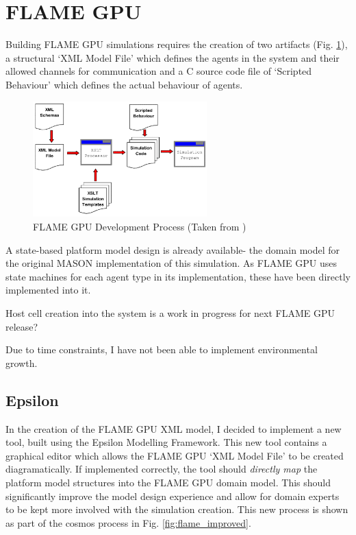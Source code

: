 \documentclass{UoYCSproject}
\begin{document}
\section{\gls{FLAME GPU}}
Building \gls{FLAME GPU} simulations requires the creation of two artifacts (Fig. \ref{fig:flame_dev}), a structural `XML Model File' which defines the agents in the system and their allowed channels for communication and a C source code file of `Scripted Behaviour' which defines the actual behaviour of agents.

\begin{figure}[htp]
\centering
\includegraphics[width=0.6\textwidth]{Appendix/FLAME_Process}
\caption{\gls{FLAME GPU} Development Process (Taken from \cite{flame_simulation})}
\label{fig:flame_dev}
\end{figure}

A state-based platform model design is already available- the domain model for the original \gls{MASON} implementation of this simulation.
As \gls{FLAME GPU} uses state machines for each agent type in its implementation, these have been directly implemented into it.

Host cell creation into the system is a work in progress for next \gls{FLAME GPU} release?

Due to time constraints, I have not been able to implement environmental growth.

\subsection{Epsilon}
In the creation of the \gls{FLAME GPU} XML model, I decided to implement a new tool, built using the Epsilon Modelling Framework.
This new tool contains a graphical editor which allows the \gls{FLAME GPU} `XML Model File' to be created diagramatically.
If implemented correctly, the tool should \textit{directly map} the platform model structures into the \gls{FLAME GPU} domain model.
This should significantly improve the model design experience and allow for domain experts to be kept more involved with the simulation creation.
This new process is shown as part of the \gls{cosmos} process in Fig. \ref{fig:flame_improved}.
\end{document}
